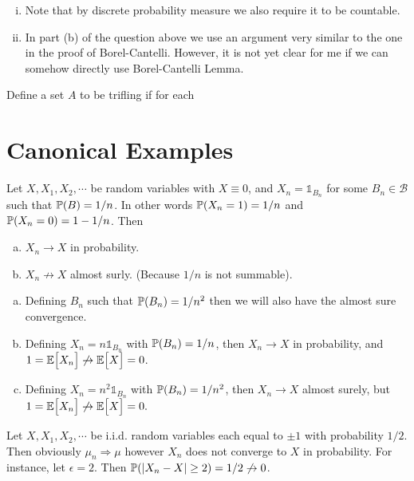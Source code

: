 \begin{remark} 
	\begin{enumerate}[(i)]
		\item Note that by discrete probability measure we also require it to be countable.
		\item In part (b) of the question above we use an argument very similar to the one in the proof of Borel-Cantelli. However, it is not yet clear for me if we can somehow directly use Borel-Cantelli Lemma.
	\end{enumerate}
\end{remark}


\begin{problem}
	Define a set $ A $ to be trifling if for each $  $
\end{problem}

\newpage

\section{Canonical Examples}
\begin{example}
	Let $ X, X_1,X_2,\cdots $ be random variables with $ X\equiv 0 $, and $ X_n = \mathds{1}_{B_n} $ for some $ B_n \in \mathcal{B} $ such that $ \mathbb{P}(B)=1/n $. In other words $ \mathbb{P}(X_n = 1) = 1/n $ and $ \mathbb{P}(X_n=0) = 1-1/n $. Then 
	\begin{enumerate}[(a)]
		\item $ X_n \to X $ in probability.
		\item $ X_n \not\to X $ almost surly. (Because $ 1/n $ is not summable). 
	\end{enumerate}
\end{example}
\begin{remark}
	\begin{enumerate}[(a)]
		\item Defining $ B_n $ such that $ \mathbb{P}(B_n) =1/n^2 $ then we will also have the almost sure convergence.
		\item Defining $ X_n = n\mathds{1}_{B_n} $ with $ \mathbb{P}(B_n)=1/n $, then $ X_n\to X $ in probability, and $ 1 = \mathbb{E}\big[X_n\big] \not\to \mathbb{E}\big[X\big] = 0 $.
		\item Defining $ X_n = n^2\mathds{1}_{B_n} $ with $ \mathbb{P}(B_n)=1/n^2 $, then $ X_n\to X $ almost surely, but $ 1 = \mathbb{E}\big[X_n\big] \not\to \mathbb{E}\big[X\big] = 0. $
	\end{enumerate}
\end{remark}


\begin{example}
	Let $ X,X_1,X_2,\cdots $ be i.i.d. random variables each equal to $ \pm 1 $ with probability $ 1/2 $. Then obviously $ \mu_n \Rightarrow \mu $ however $ X_n $ does not converge to $ X $ in probability. For instance, let $ \epsilon=2 $. Then $ \mathbb{P}(|X_n-X|\geq 2) = 1/2 \not\to 0 $.
\end{example}


